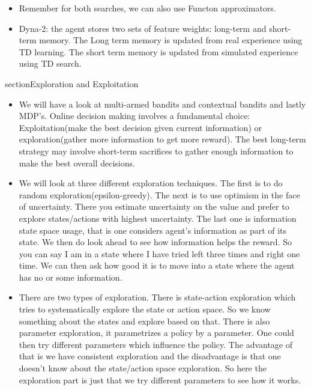 \documentclass[a4paper]{article}
\begin{document}
\begin{itemize}
\begin{center}
        \end{center}
        \item Remember for both searches, we can also use Functon approximators. 
        \item Dyna-2: the agent stores two sets of feature weights: long-term and short-term memory. The Long term memory is updated from real experience using TD learning. The short term memory is updated from simulated experience using TD search. 
\end{itemize}

section{Exploration and Exploitation}
\begin{itemize}
    \item We will have a look at multi-armed bandits and contextual bandits and lastly MDP's. 
    \tem Online decision making involves a fundamental choice: Exploitation(make the best decision given current information) or exploration(gather more information to get more reward). The best long-term strategy may involve short-term sacrifices to gather enough information to make the best overall decisions. 
    \item We will look at three different exploration techniques. The first is to do random exploration(epsilon-greedy). The next is to use optimism in the face of uncertainty. There you estimate uncertainty on the value and prefer to explore states/actions with highest uncertainty. The last one is information state space usage, that is one considers agent's information as part of its state. We then do look ahead to see how information helps the reward.  So you can say I am in a state where I have tried left three times and right one time. We can then ask how good it is to move into a state where the agent has no or some information. 
    \item There are two types of exploration. There is state-action exploration which tries to systematically explore the state or action space. So we know something about the states and explore based on that. There is also parameter exploration, it parametrizes a policy by a parameter. One could then try different parameters which influence the policy. The advantage of that is we have consistent exploration and the disadvantage is that one doesn't know about the state/action space exploration. So here the exploration part is just that we try different parameters to see how it works.
    \end{itemize}
\end{document}
